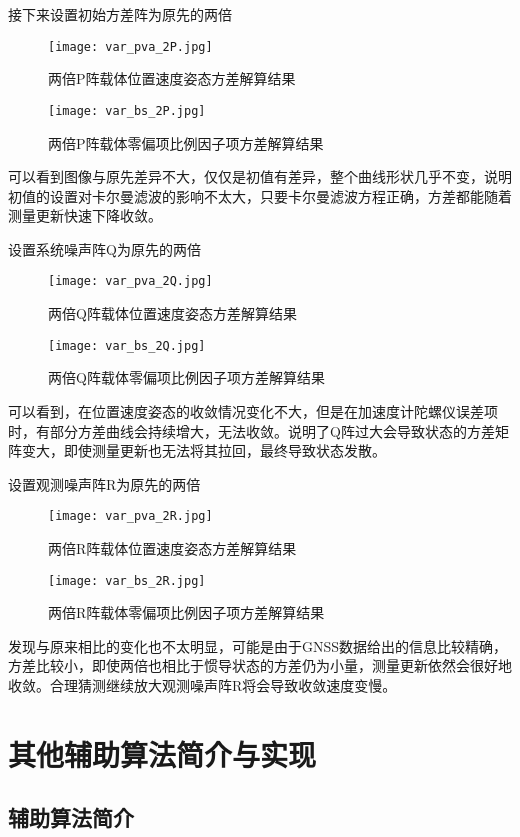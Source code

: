 \documentclass[codepkg=listings,theme=fancy]{course-report}
\begin{document}
接下来设置初始方差阵为原先的两倍
\begin{figure}[H]
\texttt{[image: var\_pva\_2P.jpg]}
\caption{两倍P阵载体位置速度姿态方差解算结果}
\end{figure}

\begin{figure}[H]
\texttt{[image: var\_bs\_2P.jpg]}
\caption{两倍P阵载体零偏项比例因子项方差解算结果}
\end{figure}

可以看到图像与原先差异不大，仅仅是初值有差异，整个曲线形状几乎不变，说明初值的设置对卡尔曼滤波的影响不太大，只要卡尔曼滤波方程正确，方差都能随着测量更新快速下降收敛。

设置系统噪声阵Q为原先的两倍
\begin{figure}[H]
\texttt{[image: var\_pva\_2Q.jpg]}
\caption{两倍Q阵载体位置速度姿态方差解算结果}
\end{figure}

\begin{figure}[H]
\texttt{[image: var\_bs\_2Q.jpg]}
\caption{两倍Q阵载体零偏项比例因子项方差解算结果}
\end{figure}

可以看到，在位置速度姿态的收敛情况变化不大，但是在加速度计陀螺仪误差项时，有部分方差曲线会持续增大，无法收敛。说明了Q阵过大会导致状态的方差矩阵变大，即使测量更新也无法将其拉回，最终导致状态发散。

设置观测噪声阵R为原先的两倍
\begin{figure}[H]
\texttt{[image: var\_pva\_2R.jpg]}
\caption{两倍R阵载体位置速度姿态方差解算结果}
\end{figure}

\begin{figure}[H]
\texttt{[image: var\_bs\_2R.jpg]}
\caption{两倍R阵载体零偏项比例因子项方差解算结果}
\end{figure}

发现与原来相比的变化也不太明显，可能是由于GNSS数据给出的信息比较精确，方差比较小，即使两倍也相比于惯导状态的方差仍为小量，测量更新依然会很好地收敛。合理猜测继续放大观测噪声阵R将会导致收敛速度变慢。
\chapter{其他辅助算法简介与实现}
\section{辅助算法简介}
\end{document}
